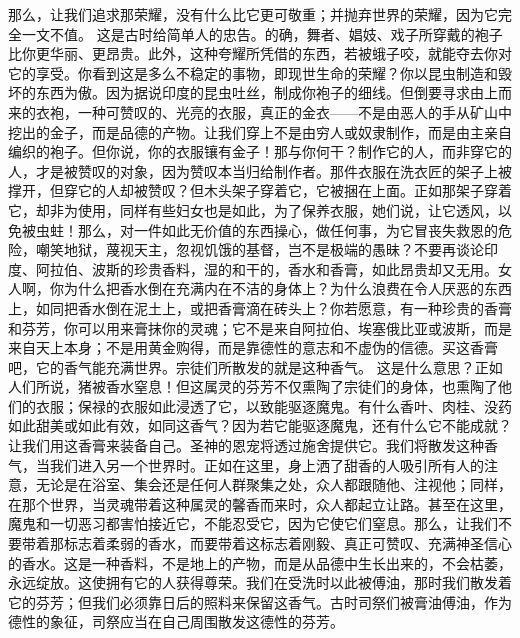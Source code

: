 那么，让我们追求那荣耀，没有什么比它更可敬重；并抛弃世界的荣耀，因为它完全一文不值。  这是古时给简单人的忠告。的确，舞者、娼妓、戏子所穿戴的袍子比你更华丽、更昂贵。此外，这种夸耀所凭借的东西，若被蛾子咬，就能夺去你对它的享受。你看到这是多么不稳定的事物，即现世生命的荣耀？你以昆虫制造和毁坏的东西为傲。因为据说印度的昆虫吐丝，制成你袍子的细线。但倒要寻求由上而来的衣袍，一种可赞叹的、光亮的衣服，真正的金衣——不是由恶人的手从矿山中挖出的金子，而是品德的产物。让我们穿上不是由穷人或奴隶制作，而是由主亲自编织的袍子。但你说，你的衣服镶有金子！那与你何干？制作它的人，而非穿它的人，才是被赞叹的对象，因为赞叹本当归给制作者。那件衣服在洗衣匠的架子上被撑开，但穿它的人却被赞叹？但木头架子穿着它，它被捆在上面。正如那架子穿着它，却非为使用，同样有些妇女也是如此，为了保养衣服，她们说，让它透风，以免被虫蛀！那么，对一件如此无价值的东西操心，做任何事，为它冒丧失救恩的危险，嘲笑地狱，蔑视天主，忽视饥饿的基督，岂不是极端的愚昧？不要再谈论印度、阿拉伯、波斯的珍贵香料，湿的和干的，香水和香膏，如此昂贵却又无用。女人啊，你为什么把香水倒在充满内在不洁的身体上？为什么浪费在令人厌恶的东西上，如同把香水倒在泥土上，或把香膏滴在砖头上？你若愿意，有一种珍贵的香膏和芬芳，你可以用来膏抹你的灵魂；它不是来自阿拉伯、埃塞俄比亚或波斯，而是来自天上本身；不是用黄金购得，而是靠德性的意志和不虚伪的信德。买这香膏吧，它的香气能充满世界。宗徒们所散发的就是这种香气。  这是什么意思？正如人们所说，猪被香水窒息！但这属灵的芬芳不仅熏陶了宗徒们的身体，也熏陶了他们的衣服；保禄的衣服如此浸透了它，以致能驱逐魔鬼。有什么香叶、肉桂、没药如此甜美或如此有效，如同这香气？因为若它能驱逐魔鬼，还有什么它不能成就？让我们用这香膏来装备自己。圣神的恩宠将透过施舍提供它。我们将散发这种香气，当我们进入另一个世界时。正如在这里，身上洒了甜香的人吸引所有人的注意，无论是在浴室、集会还是任何人群聚集之处，众人都跟随他、注视他；同样，在那个世界，当灵魂带着这种属灵的馨香而来时，众人都起立让路。甚至在这里，魔鬼和一切恶习都害怕接近它，不能忍受它，因为它使它们窒息。那么，让我们不要带着那标志着柔弱的香水，而要带着这标志着刚毅、真正可赞叹、充满神圣信心的香水。这是一种香料，不是地上的产物，而是从品德中生长出来的，不会枯萎，永远绽放。这使拥有它的人获得尊荣。我们在受洗时以此被傅油，那时我们散发着它的芬芳；但我们必须靠日后的照料来保留这香气。古时司祭们被膏油傅油，作为德性的象征，司祭应当在自己周围散发这德性的芬芳。\par

